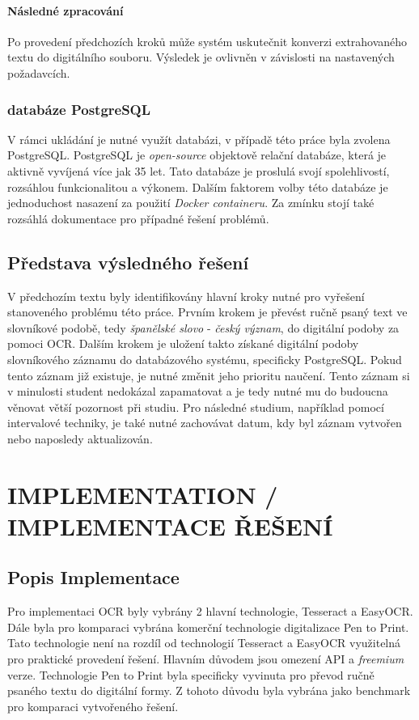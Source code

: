 \documentclass[journal]{IEEEtran}
\begin{document}
\paragraph{Následné zpracování}
Po provedení předchozích kroků může systém uskutečnit konverzi extrahovaného textu do digitálního souboru.
Výsledek je ovlivněn v závislosti na nastavených požadavcích.

\subsubsection{databáze PostgreSQL}
V rámci ukládání je nutné využít databázi, v případě této práce byla zvolena PostgreSQL.
PostgreSQL je \textit{open-source} objektově relační databáze, která je aktivně vyvíjená více jak 35 let.
Tato databáze je proslulá svojí spolehlivostí, rozsáhlou funkcionalitou a výkonem.
Dalším faktorem volby této databáze je jednoduchost nasazení za použití \textit{Docker containeru}.
Za zmínku stojí také rozsáhlá dokumentace pro případné řešení problémů.\cite{postgre}

\subsection{Představa výsledného řešení}
V předchozím textu byly identifikovány hlavní kroky nutné pro vyřešení stanoveného problému této práce.
Prvním krokem je převést ručně psaný text ve slovníkové podobě, tedy \textit{španělské slovo} - \textit{český význam}, do digitální podoby za pomoci \ac{OCR}.
Dalším krokem je uložení takto získané digitální podoby slovníkového záznamu do databázového systému, specificky PostgreSQL.
Pokud tento záznam již existuje, je nutné změnit jeho prioritu naučení.
Tento záznam si v minulosti student nedokázal zapamatovat a je tedy nutné mu do budoucna věnovat větší pozornost při studiu.
Pro následné studium, například pomocí intervalové techniky, je také nutné zachovávat datum, kdy byl záznam vytvořen nebo naposledy aktualizován.


\section{IMPLEMENTATION / IMPLEMENTACE ŘEŠENÍ}

\subsection{Popis Implementace}
Pro implementaci \ac{OCR} byly vybrány 2 hlavní technologie, Tesseract\cite{tesseract} a EasyOCR\cite{easy_ocr}.
Dále byla pro komparaci vybrána komerční technologie digitalizace Pen to Print\cite{pen_to_print}.
Tato technologie není na rozdíl od technologií Tesseract a EasyOCR využitelná pro praktické provedení řešení.
Hlavním důvodem jsou omezení \ac{API} a \textit{freemium} verze.
Technologie Pen to Print byla specificky vyvinuta pro převod ručně psaného textu do digitální formy.
Z tohoto důvodu byla vybrána jako benchmark pro komparaci vytvořeného řešení.
\end{document}
